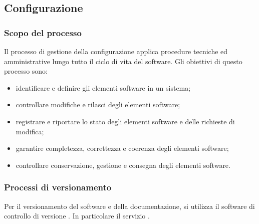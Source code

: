 \subsection{Configurazione} \label{configurazione}

		\subsubsection{Scopo del processo}

			Il processo di gestione della configurazione applica procedure tecniche ed amministrative
			lungo tutto il ciclo di vita del software. 
			Gli obiettivi di questo processo sono:

                \begin{itemize}
                    \item identificare e definire gli elementi software in un sistema;
                    \item controllare modifiche e rilasci degli elementi software;
                    \item registrare e riportare lo stato degli elementi software e delle richieste
                    di modifica;
                    \item garantire completezza, correttezza e coerenza degli elementi software;
                    \item controllare conservazione, gestione e consegna degli elementi software.
                \end{itemize}

	    \subsubsection{Processi di versionamento}

            Per il versionamento del software e della documentazione,
            si utilizza il software di controllo di versione . In particolare il servizio .

